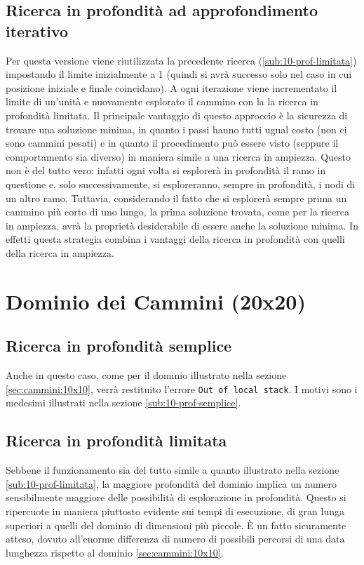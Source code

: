 \subsection{Ricerca in profondità ad approfondimento iterativo} \label{sub:10-prof-it}
Per questa versione viene riutilizzata la precedente ricerca (\ref{sub:10-prof-limitata}) impostando il limite inizialmente a 1 (quindi si avrà successo solo nel caso in cui posizione iniziale e finale coincidano). A ogni iterazione viene incrementato il limite di un'unità e nuovamente esplorato il cammino con la la ricerca in profondità limitata. Il principale vantaggio di questo approccio è la sicurezza di trovare una soluzione minima, in quanto i passi hanno tutti ugual costo (non ci sono cammini pesati) e in quanto il procedimento può essere visto (seppure il comportamento sia diverso) in maniera simile a una ricerca in ampiezza. Questo non è del tutto vero: infatti ogni volta si esplorerà in profondità il ramo in questione e, solo successivamente, si esploreranno, sempre in profondità, i nodi di un altro ramo. Tuttavia, considerando il fatto che si esplorerà sempre prima un cammino più corto di uno lungo, la prima soluzione trovata, come per la ricerca in ampiezza, avrà la proprietà desiderabile di essere anche la soluzione minima. In effetti questa strategia combina i vantaggi della ricerca in profondità con quelli della ricerca in ampiezza.

\section{Dominio dei Cammini (20x20)}
\subsection{Ricerca in profondità semplice} \label{sub:20-prof-semplice}
Anche in questo caso, come per il dominio illustrato nella sezione \ref{sec:cammini:10x10}, verrà restituito l'errore \texttt{Out of local stack}. I motivi sono i medesimi illustrati nella sezione \ref{sub:10-prof-semplice}.
\subsection{Ricerca in profondità limitata} \label{sub:20-prof-limitata}
Sebbene il funzionamento sia del tutto simile a quanto illustrato nella sezione \ref{sub:10-prof-limitata}, la maggiore profondità del dominio implica un numero sensibilmente maggiore delle possibilità di esplorazione in profondità. Questo si ripercuote in maniera piuttosto evidente sui tempi di esecuzione, di gran lunga superiori a quelli del dominio di dimensioni più piccole. È un fatto sicuramente atteso, dovuto all'enorme differenza di numero di possibili percorsi di una data lunghezza rispetto al dominio \ref{sec:cammini:10x10}.
